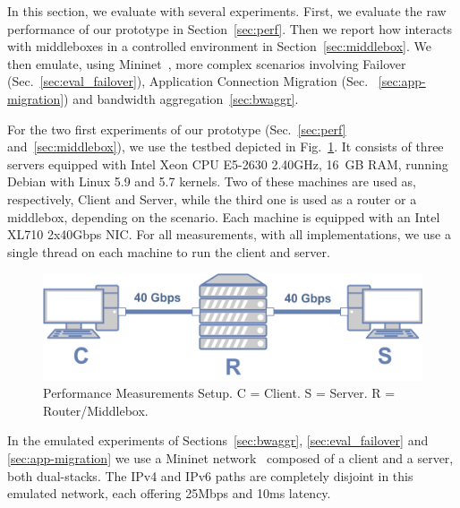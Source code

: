 
In this section, we evaluate \tcpls with several experiments.
First, we evaluate the raw performance of our \tcpls prototype in 
Section~\ref{sec:perf}. Then we report how \tcpls
interacts with middleboxes in a controlled environment in 
Section~\ref{sec:middlebox}. We then emulate, using
Mininet~\cite{handigol2012reproducible}, more complex scenarios involving 
Failover (Sec.~\ref{sec:eval_failover}), Application Connection Migration (Sec.
~\ref{sec:app-migration}) and bandwidth aggregation~\ref{sec:bwaggr}.


For the two first experiments of 
our \tcpls prototype (Sec.~\ref{sec:perf} and~\ref{sec:middlebox}), we use the 
testbed depicted
in Fig.~\ref{fig:perf_testbed}. It consists of three servers equipped
with Intel Xeon CPU E5-2630 2.40GHz, 16~GB RAM, running
Debian with Linux 5.9 and 5.7 kernels. Two of these machines are used as,
respectively, Client and Server, while the third one is used as a router or a
middlebox, depending on the scenario. Each machine is equipped with an Intel
XL710 2x40Gbps NIC. For all measurements, with all implementations, we use a 
single thread on each machine to run the client and server.

\begin{figure}[!t]
	\begin{center}
		\includegraphics[width=.6\columnwidth]{figures/testbed.png}
	\end{center}
	\vspace{-0.5cm}
	\caption{Performance Measurements Setup. C = Client. S = Server. R = 
	Router/Middlebox.}
	\label{fig:perf_testbed}
\end{figure}

In the emulated experiments of Sections~\ref{sec:bwaggr}, 
\ref{sec:eval_failover} and \ref{sec:app-migration} we use a Mininet 
network~\cite{handigol2012reproducible} composed of a client and a server, both 
dual-stacks. The IPv4 and IPv6 paths are completely disjoint in this emulated 
network, each offering 25Mbps and 10ms latency. 



